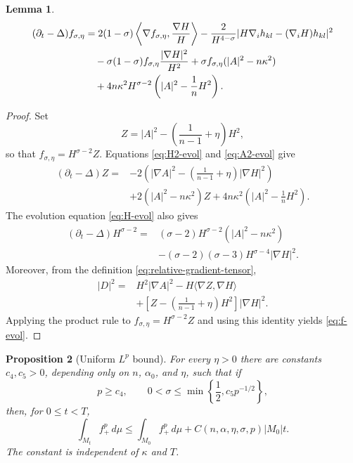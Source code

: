 \documentclass[11pt,reqno]{amsart}
\newtheorem{proposition}{Proposition}[section]
\newtheorem{lemma}[proposition]{Lemma}
\theoremstyle{definition}
\theoremstyle{remark}
\numberwithin{equation}{section}
\begin{document}
\begin{lemma}
\begin{align}
 (\partial_t-\Delta)f_{\sigma,\eta}
 &=2(1-\sigma)\left\langle
       \nabla f_{\sigma,\eta},\frac{\nabla H}{H}\right\rangle
 -\frac{2}{H^{4-\sigma}}
  |H\nabla_i h_{kl}-(\nabla_iH)h_{kl}|^2 \notag\\
 &\quad-\sigma(1-\sigma)f_{\sigma,\eta}
          \frac{|\nabla H|^2}{H^2}
 +\sigma f_{\sigma,\eta}(|A|^2-n\kappa^2)\notag\\
 &\quad+4n\kappa^2H^{\sigma-2}
       \left(|A|^2-\frac1nH^2\right).
 \label{eq:f-evol}
\end{align}
\end{lemma}
\begin{proof}
Set
\begin{equation*}
 Z =|A|^2-
 \left(\frac{1}{n-1}+\eta\right)H^2,
\end{equation*}
so that $f_{\sigma,\eta}=H^{\sigma-2}Z$.
Equations \eqref{eq:H2-evol} and \eqref{eq:A2-evol} give
\begin{align*}
 (\partial_t-\Delta)Z
 ={}&
 -2\left(
 |\nabla A|^2-
 \left(\frac{1}{n-1}+\eta\right)|\nabla H|^2
 \right)\\
 &+2(|A|^2-n\kappa^2)Z
 +4n\kappa^2
 \left(
 |A|^2-\frac1nH^2
 \right).
\end{align*}
The evolution equation \eqref{eq:H-evol} also gives
\begin{align*}
 (\partial_t-\Delta)H^{\sigma-2}
 ={}&
 (\sigma-2)H^{\sigma-2}
 (|A|^2-n\kappa^2)\\
 &-(\sigma-2)(\sigma-3)
 H^{\sigma-4}|\nabla H|^2.
\end{align*}
Moreover, from the definition \eqref{eq:relative-gradient-tensor},
\begin{align*}
 |D|^2 ={}&
 H^2|\nabla A|^2
 -H\langle\nabla Z,\nabla H\rangle\\
 &+ \left[
 Z-\left(\frac{1}{n-1}+\eta\right)H^2
 \right]|\nabla H|^2.
\end{align*}
Applying the product rule to
$f_{\sigma,\eta}=H^{\sigma-2}Z$ and using this identity yields
\eqref{eq:f-evol}.
\end{proof}

\begin{proposition}[Uniform $L^p$ bound]\label{prop:lp-bound}
For every $\eta>0$ there are constants $c_4,c_5>0$, depending only on $n$,
$\alpha_0$, and $\eta$, such that if
\begin{equation*}
 p\geq c_4,
 \qquad
 0<\sigma\leq\min\left\{\frac12,c_5p^{-1/2}\right\},
\end{equation*}
then, for $0\leq t<T$,
\begin{equation}\label{eq:lp-bound}
 \int_{M_t}f_+^p\,d\mu
 \leq\int_{M_0}f_+^p\,d\mu
 +C(n,\alpha,\eta,\sigma,p)|M_0|t.
\end{equation}
The constant is independent of $\kappa$ and $T$.
\end{proposition}
\end{document}
